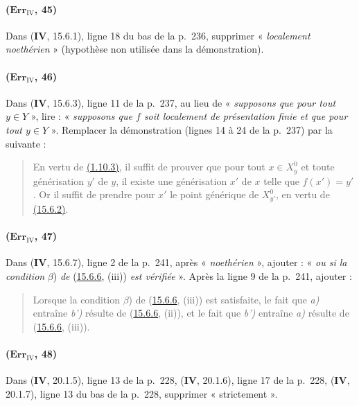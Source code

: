 \paragraph{($\mathbf{Err}_{\mathrm{IV}}$, 45)}
Dans (\textbf{IV}, 15.6.1), ligne 18 du bas de la p.~236, supprimer « \emph{localement
noethérien} » (hypothèse non utilisée dans la démonstration).

\paragraph{($\mathbf{Err}_{\mathrm{IV}}$, 46)}
Dans (\textbf{IV}, 15.6.3), ligne 11 de la p.~237, au lieu de « \emph{supposons que
pour tout $y\in Y$} », lire : « \emph{supposons que $f$ soit localement de
présentation finie et que pour tout $y\in Y$} ». Remplacer la
démonstration (lignes 14 à 24 de la p.~237) par la suivante :
\begin{quote}
En vertu de {\hyperref[canon-index.ega4.c04.prop.1-10-3]{(1.10.3)}}, il suffit de
prouver que pour tout $x\in X_y^0$ et toute générisation $y'$ de $y$,
il existe une générisation $x'$ de $x$ telle que $f(x')=y'$. Or il
suffit de prendre pour $x'$ le point générique de $X_{y'}^0$, en vertu
de {\hyperref[canon-index.ega4.c04.cor.15-6-2]{(15.6.2)}}.
\end{quote}

\paragraph{($\mathbf{Err}_{\mathrm{IV}}$, 47)}
Dans (\textbf{IV}, 15.6.7), ligne 2 de la p.~241, après « \emph{noethérien} », ajouter :
« \emph{ou si la condition} $\beta$) \emph{de}
({\hyperref[canon-index.ega4.c04.prop.15-6-6]{15.6.6}}, (iii)) \emph{est vérifiée} ».
Après la ligne 9 de la p.~241, ajouter :
\begin{quote}
Lorsque la condition $\beta$) de
({\hyperref[canon-index.ega4.c04.prop.15-6-6]{15.6.6}}, (iii)) est satisfaite, le
fait que \emph{a)} entraîne \emph{b')} résulte de
({\hyperref[canon-index.ega4.c04.prop.15-6-6]{15.6.6}}, (ii)), et le fait que \emph{b')}
entraîne \emph{a)} résulte de
({\hyperref[canon-index.ega4.c04.prop.15-6-6]{15.6.6}}, (iii)).
\end{quote}

\paragraph{($\mathbf{Err}_{\mathrm{IV}}$, 48)}
Dans (\textbf{IV}, 20.1.5), ligne 13 de la p.~228, (\textbf{IV}, 20.1.6), ligne 17 de la
p.~228, (\textbf{IV}, 20.1.7), ligne 13 du bas de la p.~228, supprimer
« strictement ».

